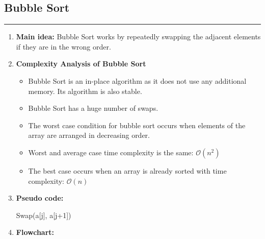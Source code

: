 \documentclass[11pt,a4paper]{article}
\begin{document}
{		\subsection{Bubble Sort}
		\rule{15cm}{0.1cm}
			\begin{enumerate}[label=\textbf{\arabic*})]
				\item \textbf{Main idea:}
				Bubble Sort works by repeatedly swapping the adjacent elements if they are in the wrong order.
				\\[12pt]
				\item \textbf{Complexity Analysis of Bubble Sort}
				\begin{itemize}
							\item Bubble Sort is an in-place algorithm as it does not use any additional memory. Its algorithm is also stable.
							\item Bubble Sort has a huge number of swaps.
							\item The worst case condition for bubble sort occurs when elements of the array are arranged in decreasing order.
							\item Worst and average case time complexity is the same: $\mathcal{O}(n^2)$
							\item The best case occurs when an array is already sorted with time complexity: $\mathcal{O}(n)$
				\end{itemize}
				\item \textbf{Pseudo code:} 
			    \begin{algorithm}
            	\begin{algorithmic}[1]
            						\State Swap(a[j], a[j+1])
            					\EndIf
            				\EndFor
            			\EndFor
            		\EndProcedure
            	\end{algorithmic}
                \end{algorithm}
				\item \textbf{Flowchart:}
					\begin{figure}[H]
						\centering 

\end{figure}
\end{enumerate}}
\end{document}
